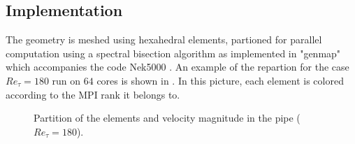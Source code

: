 \documentclass{sig-alternate}
\begin{document}

\subsection{Implementation}
\label{sec:implementation}
The geometry is meshed using hexahedral elements, partioned for parallel computation using a spectral bisection algorithm as implemented in "genmap" which accompanies the code Nek5000 \cite{argonne:nekdoc}. An example of the repartion for the case $Re_{\tau} = 180$ run on $64$ cores is shown in . In this picture, each element is colored according to the MPI rank it belongs to.
\begin{figure}
  \centering
  \caption{Partition of the elements and velocity magnitude in the pipe ($Re_{\tau}=180$).}
  \label{fig:partition}
\end{figure}
 
\end{document}
